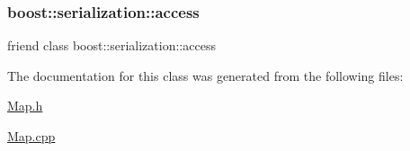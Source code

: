 \subsubsection{\texorpdfstring{boost\+::serialization\+::access}{boost::serialization::access}}
{\footnotesize\ttfamily friend class boost\+::serialization\+::access\hspace{0.3cm}{\ttfamily [friend]}}



The documentation for this class was generated from the following files\+:\begin{DoxyCompactItemize}
\item 
\hyperlink{_map_8h}{Map.\+h}\item 
\hyperlink{_map_8cpp}{Map.\+cpp}\end{DoxyCompactItemize}
